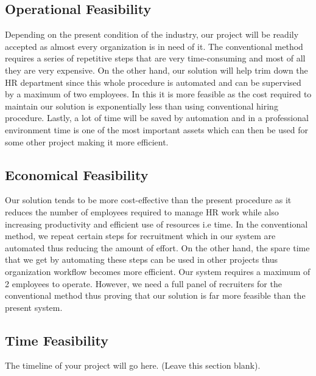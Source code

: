 \subsection{Operational Feasibility}
Depending on the present condition of the industry, our project will be readily accepted as almost every organization is in need of it. The conventional method requires a series of repetitive steps that are very time-consuming and most of all they are very expensive. On the other hand, our solution will help trim down the HR department since this whole procedure is automated and can be supervised by a maximum of two employees. In this it is more feasible as the cost required to maintain our solution is exponentially less than using conventional hiring procedure. Lastly, a lot of time will be saved by automation and in a professional environment time is one of the most important assets which can then be used for some other project making it more efficient.

\subsection{Economical Feasibility}
Our solution tends to be more cost-effective than the present procedure as it reduces the number of employees required to manage HR work while also increasing productivity and efficient use of resources i.e time. In the conventional method, we repeat certain steps for recruitment which in our system are automated thus reducing the amount of effort. On the other hand, the spare time that we get by automating these steps can be used in other projects thus organization workflow becomes more efficient. Our system requires a maximum of 2 employees to operate. However, we need a full panel of recruiters for the conventional method thus proving that our solution is far more feasible than the present system.

\subsection{Time Feasibility}
The timeline of your project will go here. (Leave this section blank). 

